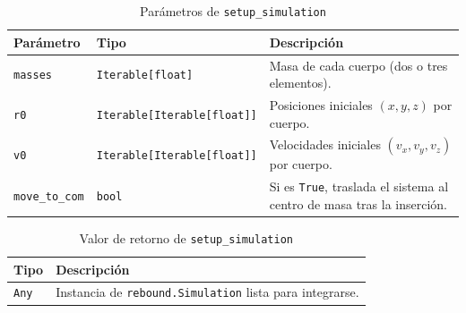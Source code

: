 \begin{table}[H]
  \centering
  \caption{Parámetros de \texttt{setup\_simulation}}
  \small
  \begin{tabularx}{\textwidth}{@{}p{}p{}X@{}}
    \toprule
    \textbf{Parámetro} & \textbf{Tipo} & \textbf{Descripción} \\
    \midrule
    \texttt{masses} & \texttt{Iterable[float]} & Masa de cada cuerpo (dos o tres elementos). \\
    \texttt{r0} & \texttt{Iterable[Iterable[float]]} & Posiciones iniciales \((x,y,z)\) por cuerpo. \\
    \texttt{v0} & \texttt{Iterable[Iterable[float]]} & Velocidades iniciales \((v_x,v_y,v_z)\) por cuerpo. \\
    \texttt{move\_to\_com} & \texttt{bool} & Si es \texttt{True}, traslada el sistema al centro de masa tras la inserción. \\
    \bottomrule
  \end{tabularx}
\end{table}
\vspace{0.2cm}

\begin{table}[H]
  \centering
  \caption{Valor de retorno de \texttt{setup\_simulation}}
  \small
  \begin{tabularx}{\textwidth}{@{}p{}X@{}}
    \toprule
    \textbf{Tipo} & \textbf{Descripción} \\
    \midrule
    \texttt{Any} & Instancia de \texttt{rebound.Simulation} lista para integrarse. \\
    \bottomrule
  \end{tabularx}
\end{table}
\vspace{0.2cm}

